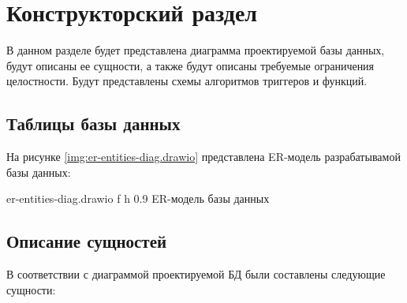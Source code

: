 \chapter{\label{design}Конструкторский раздел}

В данном разделе будет представлена диаграмма проектируемой базы данных, будут описаны ее сущности, а также будут описаны требуемые ограничения целостности. Будут представлены схемы алгоритмов триггеров и функций.

\section{Таблицы базы данных}

На рисунке \ref{img:er-entities-diag.drawio} представлена ER-модель разрабатывамой базы данных:

{er-entities-diag.drawio} %
{f} %
{h} %
{0.9\textwidth} %
{ER-модель базы данных} %

\section{Описание сущностей}

В соответствии с диаграммой проектируемой БД были составлены следующие сущности:

